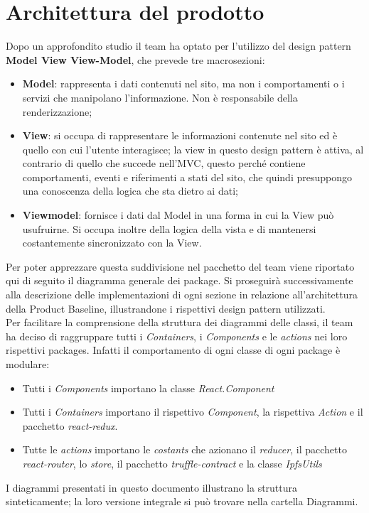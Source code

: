 \section{Architettura del prodotto}
Dopo un approfondito studio il team ha optato per l'utilizzo del design pattern \textbf{Model View View-Model}, che prevede tre macrosezioni:
	\begin{itemize}
		\item \textbf{Model}: rappresenta i dati contenuti nel sito, ma non i comportamenti o i servizi che manipolano l'informazione. Non è responsabile della renderizzazione;
		\item \textbf{View}: si occupa di rappresentare le informazioni contenute nel sito ed è quello con cui l'utente interagisce; la view in questo design pattern è attiva, al contrario di quello che succede nell'MVC, questo perché contiene comportamenti, eventi e riferimenti a stati del sito, che quindi presuppongo una conoscenza della logica che sta dietro ai dati;
		\item \textbf{Viewmodel}: fornisce i dati dal Model in una forma in cui la View può usufruirne. Si occupa inoltre della logica della vista e di mantenersi costantemente sincronizzato con la View.
	\end{itemize}
Per poter apprezzare questa suddivisione nel pacchetto del team viene riportato qui di seguito il diagramma generale dei package. Si proseguirà successivamente alla descrizione delle implementazioni di ogni sezione in relazione all'architettura della Product Baseline, illustrandone i rispettivi design pattern utilizzati.
\\Per facilitare la comprensione della struttura dei diagrammi delle classi, il team ha deciso di raggruppare tutti i \emph{Containers}, i \emph{Components} e le \emph{actions} nei loro rispettivi packages. Infatti il comportamento di ogni classe di ogni package è modulare:
	\begin{itemize}
		\item Tutti i \emph{Components} importano la classe \emph{React.Component}
		\item Tutti i \emph{Containers} importano il rispettivo \emph{Component}, la rispettiva \emph{Action} e il pacchetto \emph{react-redux}.
		\item Tutte le \emph{actions} importano le \emph{costants} che azionano il \emph{reducer}, il pacchetto \emph{react-router}, lo \emph{store}, il pacchetto \emph{truffle-contract} e la classe \emph{IpfsUtils}
	\end{itemize}
I diagrammi presentati in questo documento illustrano la struttura sinteticamente; la loro versione integrale si può trovare nella cartella Diagrammi.


